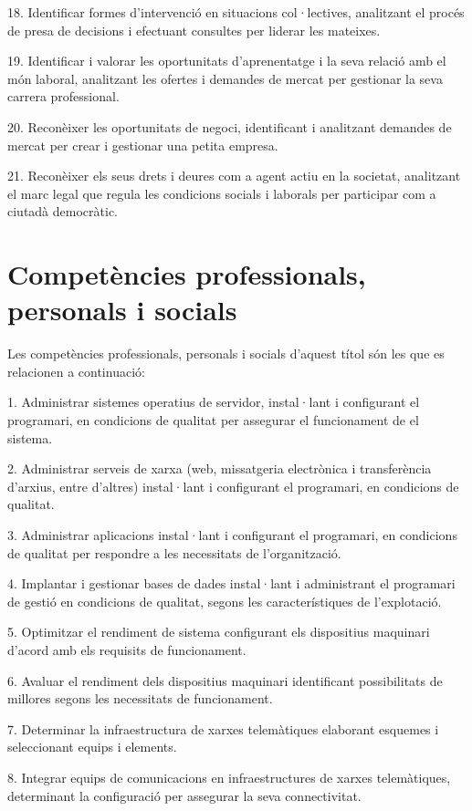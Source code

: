 \documentclass[catalan, a4paper, 12pt, titlepage]{article}
\begin{document}
18. Identificar formes d'intervenció en situacions col·lectives, analitzant el procés de presa de decisions i efectuant consultes per liderar les mateixes.

19. Identificar i valorar les oportunitats d'aprenentatge i la seva relació amb el món laboral, analitzant les ofertes i demandes de mercat per gestionar la seva carrera professional.

20. Reconèixer les oportunitats de negoci, identificant i analitzant demandes de mercat per crear i gestionar una petita empresa.

21. Reconèixer els seus drets i deures com a agent actiu en la societat, analitzant el marc legal que regula les condicions socials i laborals per participar com a ciutadà democràtic.

\section{Competències professionals, personals i socials}

Les competències professionals, personals i socials d'aquest títol són les que es relacionen a continuació:

1. Administrar sistemes operatius de servidor, instal·lant i configurant el programari, en condicions de qualitat per assegurar el funcionament de el sistema.

2. Administrar serveis de xarxa (web, missatgeria electrònica i transferència d'arxius, entre d'altres) instal·lant i configurant el programari, en condicions de qualitat.

3. Administrar aplicacions instal·lant i configurant el programari, en condicions de qualitat per respondre a les necessitats de l'organització.

4. Implantar i gestionar bases de dades instal·lant i administrant el programari de gestió en condicions de qualitat, segons les característiques de l'explotació.

5. Optimitzar el rendiment de sistema configurant els dispositius maquinari d'acord amb els requisits de funcionament.

6. Avaluar el rendiment dels dispositius maquinari identificant possibilitats de millores segons les necessitats de funcionament.

7. Determinar la infraestructura de xarxes telemàtiques elaborant esquemes i seleccionant equips i elements.

8. Integrar equips de comunicacions en infraestructures de xarxes telemàtiques, determinant la configuració per assegurar la seva connectivitat.
\end{document}
